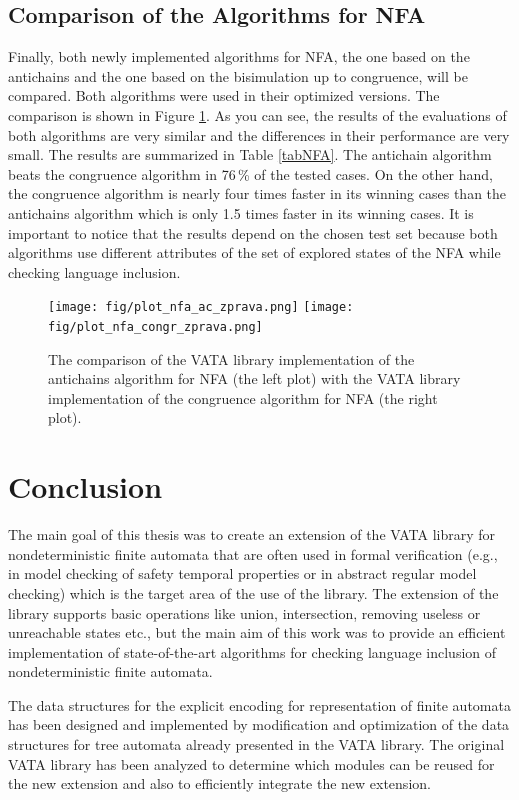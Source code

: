\section{Comparison of the Algorithms for NFA}
Finally, both newly implemented algorithms for NFA, the one based on the antichains and the one based on the bisimulation up to congruence, will be compared.
Both algorithms were used in their optimized versions.
The comparison is shown in Figure \ref{fig:figPlotNFA}.
As you can see, the results of the evaluations of both algorithms are very similar and the differences in their performance are very small. 
The results are summarized in Table \ref{tabNFA}. The antichain algorithm beats the congruence algorithm in 76\,\% of
the tested cases. On the other hand, the congruence algorithm is nearly four times faster in its winning cases than the antichains algorithm which is
only 1.5 times faster in its winning cases. 
It is important to notice that the results depend on the chosen test set because both algorithms use different attributes
of the set of explored states of the NFA while checking language inclusion.

\begin{figure}
\begin{center}
\texttt{[image: fig/plot\_nfa\_ac\_zprava.png]}
\texttt{[image: fig/plot\_nfa\_congr\_zprava.png]}
\caption{The comparison of the VATA library implementation of the antichains algorithm for NFA (the left plot)
    with the VATA library implementation of the congruence algorithm for NFA (the right plot).}
\label{fig:figPlotNFA}
\end{center}
\end{figure}

\chapter{Conclusion}
\label{concl}
The main goal of this thesis was to create an extension of the VATA library for nondeterministic finite automata 
that are often used in formal verification (e.g., in model checking of safety temporal properties or in 
abstract regular model checking) which is the target area of the use of the library. The extension of the library supports
basic operations like union, intersection, removing useless or unreachable states etc., but the main aim of this work was to provide
an efficient implementation of state-of-the-art algorithms for checking language inclusion of nondeterministic finite automata.

The data structures for the explicit encoding for representation of finite automata has been designed
and implemented by modification and optimization of the data structures for tree automata already presented in the VATA library. 
The original VATA library has been analyzed to determine
which modules can be reused for the new extension and also to efficiently integrate the new extension.

